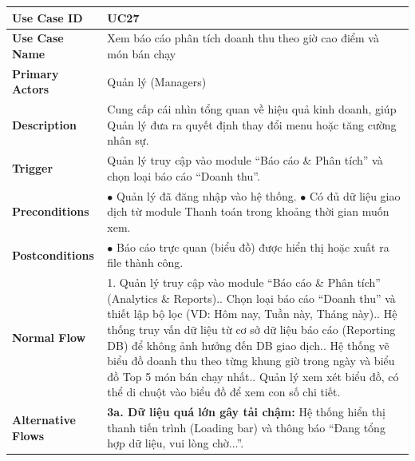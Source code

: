 \begin{longtable}{|L{3.5cm}|L{12.5cm}|}
\hline
\textbf{Use Case ID} & UC27 \\ \hline
\textbf{Use Case Name} & Xem báo cáo phân tích doanh thu theo giờ cao điểm và món bán chạy \\ \hline
\textbf{Primary Actors} & Quản lý (Managers) \\ \hline
\textbf{Description} & Cung cấp cái nhìn tổng quan về hiệu quả kinh doanh, giúp Quản lý đưa ra quyết định thay đổi menu hoặc tăng cường nhân sự. \\ \hline
\textbf{Trigger} & Quản lý truy cập vào module ``Báo cáo \& Phân tích'' và chọn loại báo cáo ``Doanh thu''. \\ \hline
\textbf{Preconditions} &
$\bullet$ Quản lý đã đăng nhập vào hệ thống.\newline
$\bullet$ Có đủ dữ liệu giao dịch từ module Thanh toán trong khoảng thời gian muốn xem. \\ \hline
\textbf{Postconditions} & $\bullet$ Báo cáo trực quan (biểu đồ) được hiển thị hoặc xuất ra file thành công. \\ \hline
\textbf{Normal Flow} &
1. Quản lý truy cập vào module ``Báo cáo \& Phân tích'' (Analytics \& Reports).. Chọn loại báo cáo ``Doanh thu'' và thiết lập bộ lọc (VD: Hôm nay, Tuần này, Tháng này).. Hệ thống truy vấn dữ liệu từ cơ sở dữ liệu báo cáo (Reporting DB) để không ảnh hưởng đến DB giao dịch.. Hệ thống vẽ biểu đồ doanh thu theo từng khung giờ trong ngày và biểu đồ Top 5 món bán chạy nhất.. Quản lý xem xét biểu đồ, có thể di chuột vào biểu đồ để xem con số chi tiết. \\ \hline
\textbf{Alternative Flows} &
\textbf{3a. Dữ liệu quá lớn gây tải chậm:} Hệ thống hiển thị thanh tiến trình (Loading bar) và thông báo ``Đang tổng hợp dữ liệu, vui lòng chờ...''. \\ \hline
\end{longtable}

